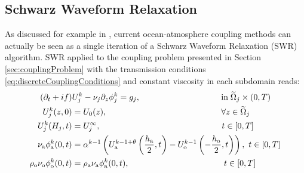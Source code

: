 \subsection{Schwarz Waveform Relaxation}
As discussed for example in \cite{marti_schwarz_2021},
current ocean-atmosphere coupling methods can actually be seen as a 
single iteration of a Schwarz Waveform Relaxation (SWR) algorithm. 
SWR applied to the coupling problem presented 
in Section \ref{sec:couplingProblem} with the transmission conditions 
 \eqref{eq:discreteCouplingConditions} and constant viscosity
 in each subdomain reads:
%
\begin{subequations}
\label{eq:SWRbulk}
\begin{align}
(\partial_t + if) &U^k_j - \nu_j\partial_z \phi^k_j  = g_j, 
\hspace{3.4cm} \mbox{in}\;\widetilde{\Omega}_j \times (0,T) \label{eq:ref} \\
U^k_j(z,0) &= U_0(z),   \hspace{4.8cm}  \forall z \in \widetilde{\Omega}_j  \\
U^k_j(H_j, t) &= U^\infty_j, \hspace{5.1cm}  t \in [0,T]\\
\nu_{\rm a}\phi_{\rm a}^{k}(0,t) &=  \alpha^{k-1} 
\left( U_{\rm a}^{k-1+\theta}\left(\frac{h_{\rm a}}{2},t\right) - U_{\rm o}^{k-1}\left(-\frac{h_{\rm o}}{2},t\right)\right), 
\hspace{0.12cm} t \in [0,T] \label{eq:bulkInterfaceCondition} \\
\rho_{\rm o} \nu_{\rm o}\phi^k_{\rm o}(0,t) &= \rho_{\rm a}
\nu_{\rm a}\phi^k_{\rm a}(0,t), \hspace{3.98cm} t \in [0,T] \label{eq:fluxInterfaceCondition}
\end{align}
\end{subequations}
